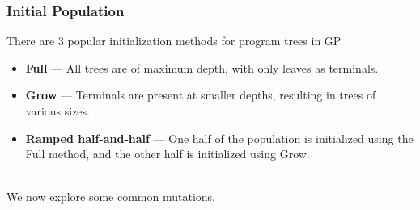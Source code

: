 \documentclass{beamer}
\begin{document}
\begin{frame}
  \frametitle{Initial Population}
  There are $3$ popular initialization methods for program trees in GP
  \begin{itemize}
    \item \textbf{Full} --- All trees are of maximum depth, with only leaves as terminals.
    \item \textbf{Grow} --- Terminals are present at smaller depths, resulting in trees of various sizes.
    \item \textbf{Ramped half-and-half} --- One half of the population is initialized using the Full method, and the other half is initialized using Grow.
  \end{itemize}
  ~\\
  We now explore some common mutations.
\end{frame}
\end{document}
